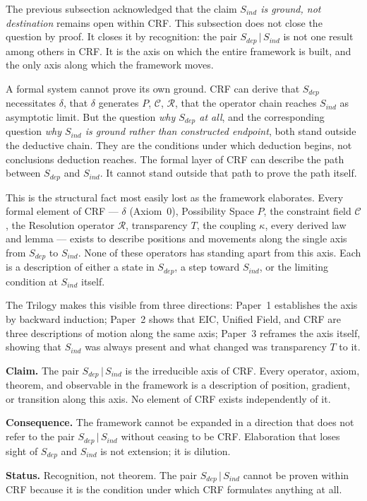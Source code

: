\documentclass[12pt, a4paper]{article}
\begin{document}
The previous subsection acknowledged that the claim \emph{$S_{ind}$ is ground, not
destination} remains open within CRF. This subsection does not close the question
by proof. It closes it by recognition: the pair $S_{dep}\,|\,S_{ind}$ is not one
result among others in CRF. It is the axis on which the entire framework is built,
and the only axis along which the framework moves.


A formal system cannot prove its own ground. CRF can derive that $S_{dep}$
necessitates $\delta$, that $\delta$ generates $P$, $\mathcal{C}$, $\mathcal{R}$,
that the operator chain reaches $S_{ind}$ as asymptotic limit. But the question
\emph{why $S_{dep}$ at all}, and the corresponding question \emph{why $S_{ind}$
is ground rather than constructed endpoint}, both stand outside the deductive
chain. They are the conditions under which deduction begins, not conclusions
deduction reaches. The formal layer of CRF can describe the path between
$S_{dep}$ and $S_{ind}$. It cannot stand outside that path to prove the path
itself.


This is the structural fact most easily lost as the framework elaborates.
Every formal element of CRF --- $\delta$ (Axiom~0), Possibility Space $P$,
the constraint field $\mathcal{C}$, the Resolution operator $\mathcal{R}$,
transparency $T$, the coupling $\kappa$, every derived law and lemma ---
exists to describe positions and movements along the single axis from
$S_{dep}$ to $S_{ind}$. None of these operators has standing apart from this axis.
Each is a description of either a state in $S_{dep}$, a step toward $S_{ind}$,
or the limiting condition at $S_{ind}$ itself.

The Trilogy makes this visible from three directions: Paper~1 establishes
the axis by backward induction; Paper~2 shows that EIC, Unified Field, and
CRF are three descriptions of motion along the same axis; Paper~3 reframes
the axis itself, showing that $S_{ind}$ was always present and what changed
was transparency $T$ to it.

\begin{keybox}[title={CLM-DS05: The Pair as Irreducible Axis of CRF}]
\textbf{Claim.} The pair $S_{dep}\,|\,S_{ind}$ is the irreducible axis of CRF.
Every operator, axiom, theorem, and observable in the framework is a description
of position, gradient, or transition along this axis. No element of CRF exists
independently of it.

\medskip
\textbf{Consequence.} The framework cannot be expanded in a direction that does
not refer to the pair $S_{dep}\,|\,S_{ind}$ without ceasing to be CRF.
Elaboration that loses sight of $S_{dep}$ and $S_{ind}$ is not extension;
it is dilution.

\medskip
\textbf{Status.} Recognition, not theorem. The pair $S_{dep}\,|\,S_{ind}$ cannot
be proven within CRF because it is the condition under which CRF formulates
anything at all.
\end{keybox}
\end{document}
